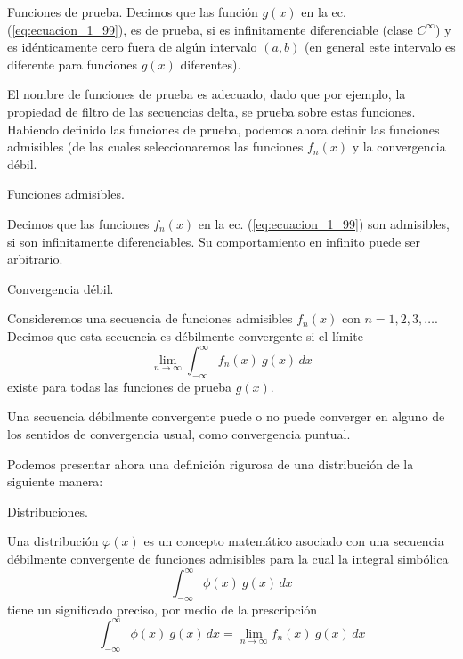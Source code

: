 \begin{defi}
Funciones de prueba.
Decimos que las función $g(x)$ en la ec. (\ref{eq:ecuacion_1_99}), es de prueba, si es infinitamente diferenciable (clase $C^{\infty}$) y es idénticamente cero fuera de algún intervalo $(a, b)$ (en general este intervalo es diferente para funciones $g(x)$ diferentes).
\end{defi}
El nombre de funciones de prueba es adecuado, dado que por ejemplo, la propiedad de filtro de las secuencias delta, se prueba sobre estas funciones. Habiendo definido las funciones de prueba, podemos ahora definir las funciones admisibles (de las cuales seleccionaremos las funciones $f_{n}(x)$ y la convergencia débil.
\begin{defi}
Funciones admisibles.

Decimos que las funciones $f_{n}(x)$ en la ec. (\ref{eq:ecuacion_1_99}) son admisibles, si son infinitamente diferenciables. Su comportamiento en infinito puede ser arbitrario.
\end{defi}
\begin{defi}
Convergencia débil.

Consideremos una secuencia de funciones admisibles $f_{n}(x) \mbox{ con } n = 1, 2, 3, \ldots $. Decimos que esta secuencia es débilmente convergente si el límite
\begin{equation}
\lim_{n \to \infty} \int_{-\infty}^{\infty} f_{n}(x) \:  g(x) \, dx
\label{eq:ecuacion_1_100}
\end{equation}
existe para todas las funciones de prueba $g(x)$.
\end{defi}
Una secuencia débilmente convergente puede o no puede converger en alguno de los sentidos de convergencia usual, como convergencia puntual.
\par
Podemos presentar ahora una definición rigurosa de una distribución de la siguiente manera:
\begin{defi}
Distribuciones.

Una distribución $\varphi (x)$ es un concepto matemático asociado con una secuencia débilmente convergente de funciones admisibles para la cual la integral simbólica
\begin{equation}
\int_{-\infty}^{\infty} \phi (x) \:  g(x) \, dx
\label{eq:ecuacion_1_101}
\end{equation}
tiene un significado preciso, por medio de la prescripción
\begin{equation}
\int_{-\infty}^{\infty} \phi (x) \: g(x) \, dx = \lim_{n \to \infty} f_{n}(x) \: g(x) \, dx
\label{eq:ecuacion_1_102}
\end{equation}
\end{defi}
